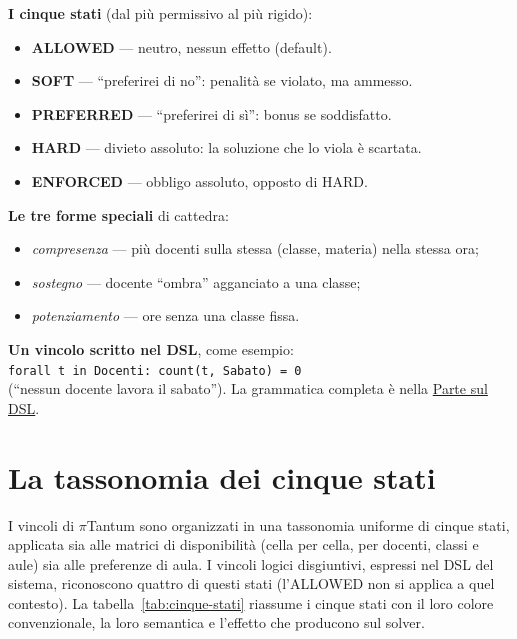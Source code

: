 \begin{schemabox}[title={Quadro di riferimento rapido}]
\textbf{I cinque stati} (dal pi\`u permissivo al pi\`u rigido):
\begin{itemize}\setlength\itemsep{0pt}
  \item \textcolor{cAllow}{\textbf{ALLOWED}} --- neutro, nessun
        effetto (default).
  \item \textcolor{cSoft}{\textbf{SOFT}} --- ``preferirei di no'':
        penalit\`a se violato, ma ammesso.
  \item \textcolor{cPref}{\textbf{PREFERRED}} --- ``preferirei di
        s\`i'': bonus se soddisfatto.
  \item \textcolor{cHard}{\textbf{HARD}} --- divieto assoluto: la
        soluzione che lo viola \`e scartata.
  \item \textcolor{cEnf}{\textbf{ENFORCED}} --- obbligo assoluto,
        opposto di HARD.
\end{itemize}
\textbf{Le tre forme speciali} di cattedra:
\begin{itemize}\setlength\itemsep{0pt}
  \item \emph{compresenza} --- pi\`u docenti sulla stessa
        (classe, materia) nella stessa ora;
  \item \emph{sostegno} --- docente ``ombra'' agganciato a una
        classe;
  \item \emph{potenziamento} --- ore senza una classe fissa.
\end{itemize}
\textbf{Un vincolo scritto nel DSL}, come esempio:\\
\texttt{forall t in Docenti: count(t, Sabato) = 0}\\
(``nessun docente lavora il sabato''). La grammatica completa \`e
nella \hyperref[part:dsl]{Parte sul DSL}.
\end{schemabox}

\section{La tassonomia dei cinque stati}
\label{sec:cinque-stati}

I vincoli di $\pi$Tantum sono organizzati in una tassonomia
uniforme di cinque stati, applicata sia alle matrici di
disponibilit\`a (cella per cella, per docenti, classi e
aule) sia alle preferenze di aula. I vincoli logici
disgiuntivi, espressi nel DSL del sistema, riconoscono
quattro di questi stati (l'ALLOWED non si applica a quel
contesto). La tabella~\ref{tab:cinque-stati} riassume i
cinque stati con il loro colore convenzionale, la loro
semantica e l'effetto che producono sul solver.

